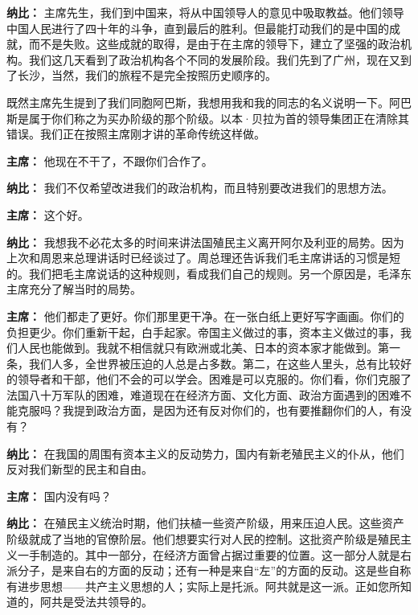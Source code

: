 \begin{duihua}
\item[\textbf{纳比：}] 主席先生，我们到中国来，将从中国领导人的意见中吸取教益。他们领导中国人民进行了四十年的斗争，直到最后的胜利。但最能打动我们的是中国的成就，而不是失败。这些成就的取得，是由于在主席的领导下，建立了坚强的政治机构。我们这几天看到了政治机构各个不同的发展阶段。我们先到了广州，现在又到了长沙，当然，我们的旅程不是完全按照历史顺序的。

既然主席先生提到了我们同胞阿巴斯，我想用我和我的同志的名义说明一下。阿巴斯是属于你们称之为买办阶级的那个阶级。以本·贝拉为首的领导集团正在清除其错误。我们正在按照主席刚才讲的革命传统这样做。

\item[\textbf{主席：}] 他现在不干了，不跟你们合作了。

\item[\textbf{纳比：}] 我们不仅希望改进我们的政治机构，而且特别要改进我们的思想方法。

\item[\textbf{主席：}] 这个好。

\item[\textbf{纳比：}] 我想我不必花太多的时间来讲法国殖民主义离开阿尔及利亚的局势。因为上次和周恩来总理讲话时已经谈过了。周总理还告诉我们毛主席讲话的习惯是短的。我们把毛主席说话的这种规则，看成我们自己的规则。另一个原因是，毛泽东主席充分了解当时的局势。

\item[\textbf{主席：}] 他们都走了更好。你们那里更干净。在一张白纸上更好写字画画。你们的负担更少。你们重新干起，白手起家。帝国主义做过的事，资本主义做过的事，我们人民也能做到。我就不相信就只有欧洲或北美、日本的资本家才能做到。第一条，我们人多，全世界被压迫的人总是占多数。第二，在这些人里头，总有比较好的领导者和干部，他们不会的可以学会。困难是可以克服的。你们看，你们克服了法国八十万军队的困难，难道现在在经济方面、文化方面、政治方面遇到的困难不能克服吗？我提到政治方面，是因为还有反对你们的，也有要推翻你们的人，有没有？

\item[\textbf{纳比：}] 在我国的周围有资本主义的反动势力，国内有新老殖民主义的仆从，他们反对我们新型的民主和自由。

\item[\textbf{主席：}] 国内没有吗？

\item[\textbf{纳比：}] 在殖民主义统治时期，他们扶植一些资产阶级，用来压迫人民。这些资产阶级就成了当地的官僚阶层。他们想要实行对人民的控制。这批资产阶级是殖民主义一手制造的。其中一部分，在经济方面曾占据过重要的位置。这一部分人就是右派分子，是来自右的方面的反动；还有一种是来自“左”的方面的反动。这是些自称有进步思想——共产主义思想的人；实际上是托派。阿共就是这一派。正如您所知道的，阿共是受法共领导的。


\end{duihua}
